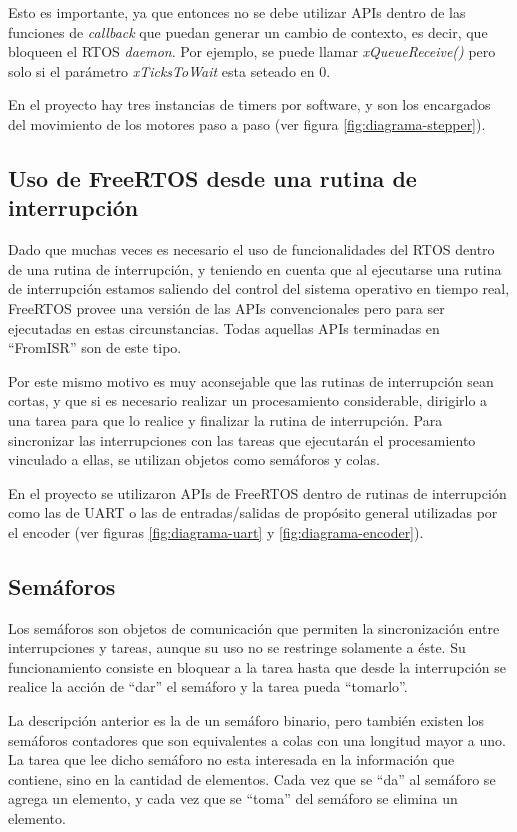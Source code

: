 \documentclass{IEEEtran}
\begin{document}
Esto es importante, ya que entonces no se debe utilizar APIs dentro de las funciones de \textit{callback} que puedan generar un cambio de contexto, es decir, que bloqueen el RTOS \textit{daemon}. Por ejemplo, se puede llamar \textit{xQueueReceive()} pero solo si el parámetro \textit{xTicksToWait} esta seteado en 0.

En el proyecto hay tres instancias de timers por software, y son los encargados del movimiento de los motores paso a paso (ver figura \ref{fig:diagrama-stepper}).

\subsection{Uso de FreeRTOS desde una rutina de interrupción}
Dado que muchas veces es necesario el uso de funcionalidades del RTOS dentro de una rutina de interrupción, y teniendo en cuenta que al ejecutarse una rutina de interrupción estamos saliendo del control del sistema operativo en tiempo real, FreeRTOS provee una versión de las APIs convencionales pero para ser ejecutadas en estas circunstancias. Todas aquellas APIs terminadas en ``FromISR'' son de este tipo.

Por este mismo motivo es muy aconsejable que las rutinas de interrupción sean cortas, y que si es necesario realizar un procesamiento considerable, dirigirlo a una tarea para que lo realice y finalizar la rutina de interrupción. Para sincronizar las interrupciones con las tareas que ejecutarán el procesamiento vinculado a ellas, se utilizan objetos como semáforos y colas.

En el proyecto se utilizaron APIs de FreeRTOS dentro de rutinas de interrupción como las de UART o las de entradas/salidas de propósito general utilizadas por el encoder (ver figuras \ref{fig:diagrama-uart} y \ref{fig:diagrama-encoder}).

\subsection{Semáforos}
Los semáforos son objetos de comunicación que permiten la sincronización entre interrupciones y tareas, aunque su uso no se restringe solamente a éste. Su funcionamiento consiste en bloquear a la tarea hasta que desde la interrupción se realice la acción de ``dar'' el semáforo y la tarea pueda ``tomarlo''.

La descripción anterior es la de un semáforo binario, pero también existen los semáforos contadores que son equivalentes a colas con una longitud mayor a uno. La tarea que lee dicho semáforo no esta interesada en la información que contiene, sino en la cantidad de elementos. Cada vez que se ``da'' al semáforo se agrega un elemento, y cada vez que se ``toma'' del semáforo se elimina un elemento.
\end{document}

